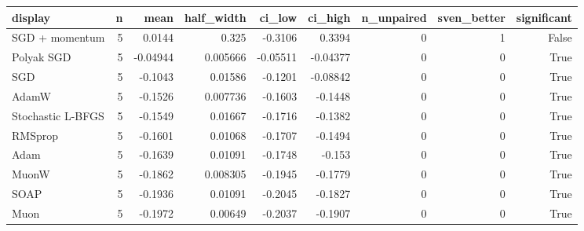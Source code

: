 \begin{tabular}{lrrrrrrrr}
\toprule
display & n & mean & half\_width & ci\_low & ci\_high & n\_unpaired & sven\_better & significant \\
\midrule
SGD + momentum & 5 & 0.0144 & 0.325 & -0.3106 & 0.3394 & 0 & 1 & False \\
Polyak SGD & 5 & -0.04944 & 0.005666 & -0.05511 & -0.04377 & 0 & 0 & True \\
SGD & 5 & -0.1043 & 0.01586 & -0.1201 & -0.08842 & 0 & 0 & True \\
AdamW & 5 & -0.1526 & 0.007736 & -0.1603 & -0.1448 & 0 & 0 & True \\
Stochastic L-BFGS & 5 & -0.1549 & 0.01667 & -0.1716 & -0.1382 & 0 & 0 & True \\
RMSprop & 5 & -0.1601 & 0.01068 & -0.1707 & -0.1494 & 0 & 0 & True \\
Adam & 5 & -0.1639 & 0.01091 & -0.1748 & -0.153 & 0 & 0 & True \\
MuonW & 5 & -0.1862 & 0.008305 & -0.1945 & -0.1779 & 0 & 0 & True \\
SOAP & 5 & -0.1936 & 0.01091 & -0.2045 & -0.1827 & 0 & 0 & True \\
Muon & 5 & -0.1972 & 0.00649 & -0.2037 & -0.1907 & 0 & 0 & True \\
\bottomrule
\end{tabular}

